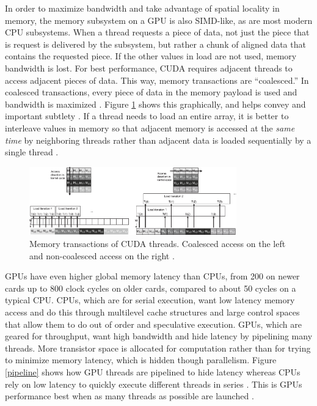 In order to maximize bandwidth and take advantage of spatial locality in memory, the memory subsystem on a GPU is also SIMD-like, as are most modern CPU subsystems.  When a thread requests a piece of data, not just the piece that is request is delivered by the subsystem, but rather a chunk of aligned data that contains the requested piece.  If the other values in load are not used, memory bandwidth is lost.  For best performance, CUDA requires adjacent threads to access adjacent pieces of data.  This way, memory transactions are ``coalesced.''   In coalesced transactions, every piece of data in the memory payload is used and bandwidth is maximized \cite{cuda}.  Figure \ref{coalesced} shows this graphically, and helps convey and important subtlety \cite{programming_massively}.  If a thread needs to load an entire array, it is better to interleave values in memory so that adjacent memory is accessed at the \emph{same time} by neighboring threads rather than adjacent data is loaded sequentially by a single thread \cite{cuda}.

\begin{figure}[h!] 
  \centering
    \includegraphics[width=0.8\textwidth]{graphics/coalesced.eps}
     \caption[Memory transactions of CUDA threads.]{Memory transactions of CUDA threads.  Coalesced access on the left and non-coalesced access on the right \cite{programming_massively}. \label{coalesced}}
\end{figure}

GPUs have even higher global memory latency than CPUs, from 200 on newer cards up to 800 clock cycles on older cards, compared to about 50 cycles on a typical CPU.  CPUs, which are for serial execution, want low latency memory access and do this through multilevel cache structures and large control spaces that allow them to do out of order and speculative execution.  GPUs, which are geared for throughput, want high bandwidth and hide latency by pipelining many threads.  More transistor space is allocated for computation rather than for trying to minimize memory latency, which is hidden though parallelism.  Figure \ref{pipeline} shows how GPU threads are pipelined to hide latency whereas CPUs rely on low latency to quickly execute different threads in series \cite{cuda_gtc_pres}.  This is GPUs performance best when as many threads as possible are launched \cite{cuda}.

